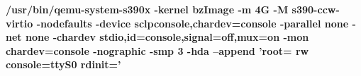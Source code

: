 \textbf{/usr/bin/qemu-system-s390x -kernel bzImage -m 4G -M s390-ccw-virtio -nodefaults -device sclpconsole,chardev=console -parallel none -net none -chardev stdio,id=console,signal=off,mux=on -mon chardev=console -nographic -smp 3 -hda  --append 'root= rw console=ttyS0 rdinit='}

\Blindtext
